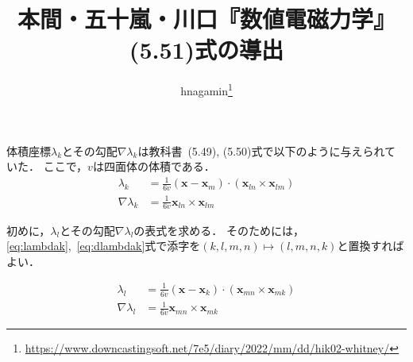 \documentclass{jlreq}
\title{本間・五十嵐・川口『数値電磁力学』 (5.51)式の導出}
\author{hnagamin\thanks{\url{https://www.downcastingsoft.net/7e5/diary/2022/mm/dd/hik02-whitney/}}}
\begin{document}
\maketitle

体積座標\(\lambda_k\)とその勾配\(\nabla\lambda_k\)は教科書~(5.49), (5.50)式で以下のように与えられていた\cite[p. 159]{Homma2002}．
ここで，\(v\)は四面体の体積である．
\begin{align}
  \lambda_k
  &= \frac{1}{6v}(\bm{x}-\bm{x}_m)\cdot(\bm{x}_{l n}\times\bm{x}_{lm})
  \label{eq:lambdak} \\
  \nabla \lambda_k
  &= \frac{1}{6v}\bm{x}_{l n}\times\bm{x}_{lm}
  \label{eq:dlambdak}
\end{align}

初めに，\(\lambda_l\)とその勾配\(\nabla\lambda_l\)の表式を求める．
そのためには，\eqref{eq:lambdak},~\eqref{eq:dlambdak}式で添字を\(
  (k,l,m,n)\mapsto(l,m,n,k)
\)と置換すればよい．

\begin{align}
  \lambda_l
  &= \frac{1}{6v}(\bm{x}-\bm{x}_k)\cdot(\bm{x}_{mn}\times\bm{x}_{mk})
  \label{eq:lambdal} \\
  \nabla\lambda_l
  &= \frac{1}{6v}\bm{x}_{mn}\times\bm{x}_{mk}
  \label{eq:dlambdal}
\end{align}
\end{document}
